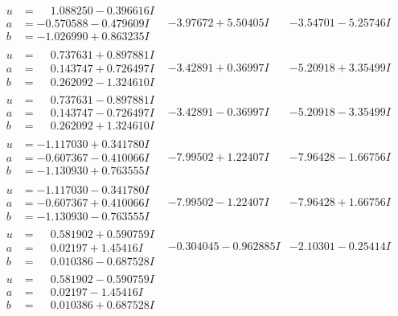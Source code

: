 \documentclass[1p]{elsarticle_modified}
\theoremstyle{definition}
\begin{document}
$$\begin{array}{c|c|c}
\begin{aligned}
u &= \phantom{-}1.088250 - 0.396616 I \\
a &= -0.570588 - 0.479609 I \\
b &= -1.026990 + 0.863235 I\end{aligned}
 & -3.97672 + 5.50405 I & -3.54701 - 5.25746 I \\ \hline\begin{aligned}
u &= \phantom{-}0.737631 + 0.897881 I \\
a &= \phantom{-}0.143747 + 0.726497 I \\
b &= \phantom{-}0.262092 - 1.324610 I\end{aligned}
 & -3.42891 + 0.36997 I & -5.20918 + 3.35499 I \\ \hline\begin{aligned}
u &= \phantom{-}0.737631 - 0.897881 I \\
a &= \phantom{-}0.143747 - 0.726497 I \\
b &= \phantom{-}0.262092 + 1.324610 I\end{aligned}
 & -3.42891 - 0.36997 I & -5.20918 - 3.35499 I \\ \hline\begin{aligned}
u &= -1.117030 + 0.341780 I \\
a &= -0.607367 - 0.410066 I \\
b &= -1.130930 + 0.763555 I\end{aligned}
 & -7.99502 + 1.22407 I & -7.96428 - 1.66756 I \\ \hline\begin{aligned}
u &= -1.117030 - 0.341780 I \\
a &= -0.607367 + 0.410066 I \\
b &= -1.130930 - 0.763555 I\end{aligned}
 & -7.99502 - 1.22407 I & -7.96428 + 1.66756 I \\ \hline\begin{aligned}
u &= \phantom{-}0.581902 + 0.590759 I \\
a &= \phantom{-}0.02197 + 1.45416 I \\
b &= \phantom{-}0.010386 - 0.687528 I\end{aligned}
 & -0.304045 - 0.962885 I & -2.10301 - 0.25414 I \\ \hline\begin{aligned}
u &= \phantom{-}0.581902 - 0.590759 I \\
a &= \phantom{-}0.02197 - 1.45416 I \\
b &= \phantom{-}0.010386 + 0.687528 I\end{aligned}

\end{array}$$
\end{document}
